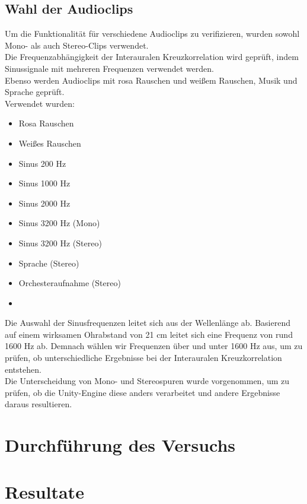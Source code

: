 \documentclass[12pt,a4paper]{article}
\begin{document}
\subsection{Wahl der Audioclips}
Um die Funktionalität für verschiedene Audioclips zu verifizieren, wurden sowohl Mono- als auch Stereo-Clips verwendet.\\ 
Die Frequenzabhängigkeit der Interauralen Kreuzkorrelation wird geprüft, indem Sinussignale mit mehreren Frequenzen verwendet werden.\\ 
Ebenso werden Audioclips mit rosa Rauschen und weißem Rauschen, Musik und Sprache geprüft.\\

Verwendet wurden:
\begin{multicols}{2}
\begin{itemize}
\item Rosa Rauschen
\item Weißes Rauschen
\item Sinus 200 Hz
\item Sinus 1000 Hz
\item Sinus 2000 Hz
\item Sinus 3200 Hz (Mono)
\item Sinus 3200 Hz (Stereo)
\item Sprache (Stereo)
\item Orchesteraufnahme (Stereo)
\item[\vspace{\fill}]
\end{itemize}
\end{multicols}

Die Auswahl der Sinusfrequenzen leitet sich aus der Wellenlänge ab. Basierend auf einem wirksamen Ohrabstand von 21 cm leitet sich eine Frequenz von rund 1600 Hz ab. Demnach wählen wir Frequenzen über und unter 1600 Hz aus, um zu prüfen, ob unterschiedliche Ergebnisse bei der Interauralen Kreuzkorrelation entstehen.\\

Die Unterscheidung von Mono- und Stereospuren wurde vorgenommen, um zu prüfen, ob die Unity-Engine diese anders verarbeitet und andere Ergebnisse daraus resultieren. 

\section{Durchführung des Versuchs}

\section{Resultate}
\end{document}

